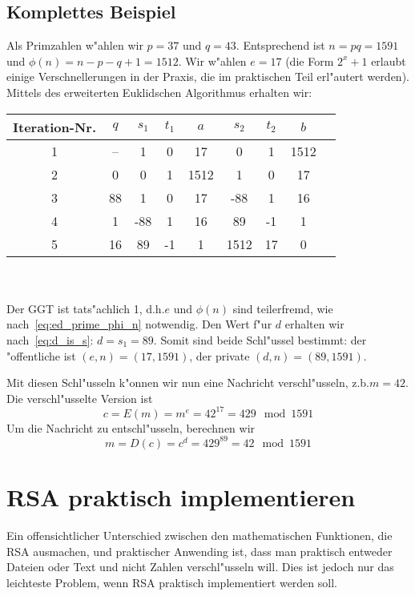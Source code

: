 \documentclass[12pt]{article}
\begin{document}
\subsection{Komplettes Beispiel}

Als Primzahlen w"ahlen wir $p = 37$ und $q = 43$.
Entsprechend ist $n = pq = 1591$ und $\phi(n) = n - p - q + 1 = 1512$.
Wir w"ahlen $e = 17$ (die Form $2^x+1$ erlaubt einige Verschnellerungen in der Praxis, die im praktischen Teil erl"autert werden).
Mittels des erweiterten Euklidschen Algorithmus erhalten wir:\\

\begin{tabular}{c|c c c c c c c l}
    Iteration-Nr. & $q$ & $s_1$ & $t_1$ & $a$ & $s_2$ & $t_2$ & $b$ \\
    \hline
    1 & -- & 1 & 0 & 17 & 0 & 1 & 1512 \\
    2 & 0 & 0 & 1 & 1512 & 1 & 0 & 17 \\
    3 & 88 & 1 & 0 & 17 & -88 & 1 & 16 \\
    4 & 1 & -88 & 1 & 16 & 89 & -1 & 1 \\
    5 & 16 & 89 & -1 & 1 & 1512 & 17 & 0 \\
\end{tabular}
~\\~\\
\noindent
Der GGT ist tats"achlich 1, d.h.\@ $e$ und $\phi(n)$ sind teilerfremd, wie nach~\eqref{eq:ed_prime_phi_n} notwendig.
Den Wert f"ur $d$ erhalten wir nach~\eqref{eq:d_is_s}: $d = s_1 = 89$.
Somit sind beide Schl"ussel bestimmt: der "offentliche ist $(e, n) = (17, 1591)$, der private $(d, n) = (89, 1591)$.

Mit diesen Schl"usseln k"onnen wir nun eine Nachricht verschl"usseln, z.b.\@ $m = 42$.
Die verschl"usselte Version ist \[c = E(m) = m^e = 42^{17} = 429 \mod 1591\]
Um die Nachricht zu entschl"usseln, berechnen wir
\[m = D(c) = c^d = 429^{89} = 42 \mod 1591\]

\section{RSA praktisch implementieren}

Ein offensichtlicher Unterschied zwischen den mathematischen Funktionen,
die RSA ausmachen, und praktischer Anwending ist, dass man praktisch entweder Dateien
oder Text und nicht Zahlen verschl"usseln will.
Dies ist jedoch nur das leichteste Problem, wenn RSA praktisch implementiert werden soll.
\end{document}
